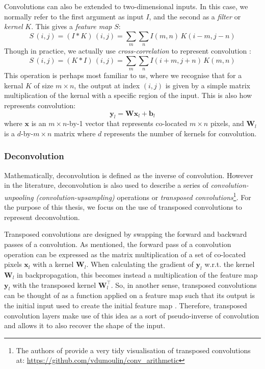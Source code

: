 Convolutions can also be extended to two-dimensional inputs. In this case, we normally refer to the first argument as input $I$, and the second as a \textit{filter} or \textit{kernel} $K$. This gives a \textit{feature map} $S$:
\begin{equation}
S\,(i, j) = (I * K)\,(i, j) = \sum_{m}\sum_{n} I(m, n) \, K(i - m, j - n) \label{eq:2_2d_convolution}
\end{equation}
Though in practice, we actually use \textit{cross-correlation} to represent convolution \cite{DeepLearningBook}:
\begin{equation}
S\,(i, j) = (K * I)\,(i, j) = \sum_{m}\sum_{n} I(i + m, j + n) \, K(m, n) \label{eq:2_2d_convolution_cross_correlation}
\end{equation}
This operation is perhaps most familiar to us, where we recognise that for a kernal $K$ of size $m\times n$, the output at index $(i,j)$ is given by a simple matrix multiplication of the kernal with a specific region of the input. This is also how \cite{RectifiersKaimingHe2015} represents convolution:
\begin{equation}
    \boldsymbol{y}_l = \boldsymbol{W}\boldsymbol{x}_l + \boldsymbol{b}_l
\end{equation}
where $\boldsymbol{x}$ is an $m\times n$-by-1 vector that represents co-located $m \times n$ pixels, and $\boldsymbol{W}_l$ is a $d$-by-$m\times n$ matrix where $d$ represents the number of kernels for convolution.

\subsubsection{Deconvolution}
Mathematically, deconvolution is defined as the inverse of convolution. However in the literature, deconvolution is also used to describe a series of \textit{convolution-unpooling (convolution-upsampling)} operations \cite{conv_vae} or \textit{transposed convolutions}\footnote{The authors of \cite{deconv_visualised} provide a very tidy visualisation of transposed convolutions at: \url{https://github.com/vdumoulin/conv_arithmetic}}.
For the purpose of this thesis, we focus on the use of transposed convolutions to represent deconvolution.

Transposed convolutions are designed by swapping the forward and backward passes of a convolution. As mentioned, the forward pass of a convolution operation can be expressed as the matrix multiplication of a set of co-located pixels $\boldsymbol{x}_l$ with a kernel $\boldsymbol{W}_l$. When calculating the gradient of $\boldsymbol{y}_l$ w.r.t. the kernel $\boldsymbol{W}_l$ in backpropagation, this becomes instead a multiplication of the feature map $\boldsymbol{y}_l$ with the transposed kernel $\boldsymbol{W}^\top_l$. So, in another sense, transposed convolutions can be thought of as a function applied on a feature map such that its output is the initial input used to create the initial feature map \cite{deconv_visualised}. 
Therefore, transposed convolution layers make use of this idea as a sort of pseudo-inverse of convolution and allows it to also recover the shape of the input. 

